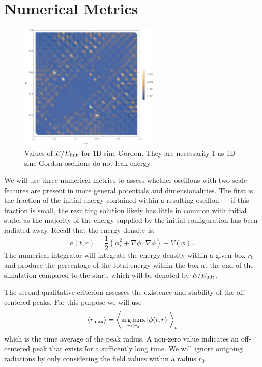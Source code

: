 \documentclass{report}
\DeclareMathOperator*{\argmax}{arg\,max}
\begin{document}
\section{Numerical Metrics}\label{numerical}
\begin{figure}
  \centering
  \includegraphics[width=0.6\textwidth]{plot/energy-ratio-sine-1d.pdf}
  \caption{Values of $E/E_{\rm init}$ for 1D sine-Gordon. They are necessarily 1 as 1D sine-Gordon oscillons do not leak energy.}\label{sine1denergy}
\end{figure}

We will use three numerical metrics to assess whether oscillons with two-scale features are present in more general potentials and dimensionalities.  The first is the fraction of the initial energy contained within a resulting oscillon --- if this fraction is small,  the resulting solution likely has little in common with initial state, as the majority of the energy supplied by the initial configuration has  been radiated away. Recall that the energy density is:
\begin{equation}
  e(t,r) = \frac{1}{2}\left(\phi_t^2+ \nabla \phi\cdot \nabla \phi \right) + V(\phi) \, .
\end{equation}
The numerical integrator will integrate the energy density within a given box $r_0$ and produce the percentage of the total energy within the box at the end of the simulation compared to the start, which will be denoted by $E/E_{\rm init}$.

The second qualitative criterion assesses the existence and stability of the off-centered peaks. For this purpose we will use
\begin{equation}
  \langle r_{\rm max} \rangle  = \left\langle \argmax_{r < r_0} |\phi(t,r)| \right\rangle_t
\end{equation}
which is the time average of the peak radius. A non-zero value indicates an off-centered peak that exists for a sufficently long time. We will ignore outgoing radiations by only considering the field values within a radius $r_0$.
\end{document}
